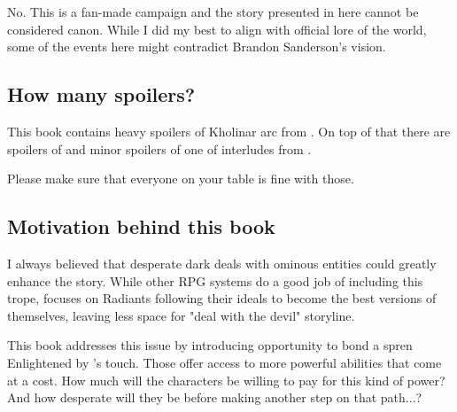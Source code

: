 No. This is a fan-made campaign and the story presented in here cannot be considered canon. While I did my best to align with official lore of the world, some of the events here might contradict Brandon Sanderson’s vision.

\subsection{How many spoilers?}

This book contains heavy spoilers of Kholinar arc from \bookOB{}. On top of that there are spoilers of \bookWAT{} and minor spoilers of one of interludes from \bookWOR{}.

Please make sure that everyone on your table is fine with those.

\subsection{Motivation behind this book}

I always believed that desperate dark deals with ominous entities could greatly enhance the story. While other RPG systems do a good job of including this trope, \bookSA{} focuses on Radiants following their ideals to become the best versions of themselves, leaving less space for "deal with the devil" storyline.

This book addresses this issue by introducing opportunity to bond a spren Enlightened by \npcSjaAnat{}'s touch. Those offer access to more powerful abilities that come at a cost. How much will the characters be willing to pay for this kind of power? And how desperate will they be before making another step on that path...?